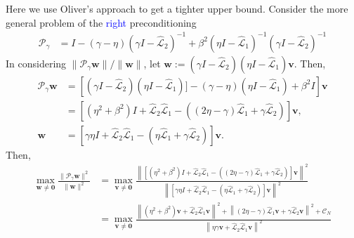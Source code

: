 \documentclass[a4paper,10pt]{article}
\newcommand{\tcb}{\textcolor{blue}}
\begin{document}
{Here we use Oliver's approach to get a tighter upper bound.
Consider the more general problem of the \tcb{right} preconditioning 
%
\begin{align}\nonumber
\mathcal{P}_\gamma & = I - (\gamma - \eta)( \gamma I- \widehat{\mathcal{L}}_2)^{-1} + 
	\beta^2( \eta I-\widehat{\mathcal{L}}_1)^{-1}
	( \gamma I- \widehat{\mathcal{L}}_2)^{-1}\nonumber
\end{align}
%
In considering $\|\mathcal{P}_\gamma\mathbf{w}\|/\|\mathbf{w}\|$, let $\mathbf{w}:= 
(\gamma I- \widehat{\mathcal{L}}_2)(\eta I-\widehat{\mathcal{L}}_1)\mathbf{v}$.
Then,
%
\begin{align*}
\mathcal{P}_\gamma\mathbf{w} & = \left[
	(\gamma I- \widehat{\mathcal{L}}_2)(\eta I-\widehat{\mathcal{L}}_1) ]
	 - (\gamma - \eta)(\eta I-\widehat{\mathcal{L}}_1) + \beta^2 I\right]\mathbf{v} \\
& = \left[ (\eta^2+\beta^2) I +	\widehat{\mathcal{L}}_2\widehat{\mathcal{L}}_1 -
	( (2\eta - \gamma)\widehat{\mathcal{L}}_1 +
	\gamma \widehat{\mathcal{L}}_2) \right]\mathbf{v}, \\
\mathbf{w} & = \left[ \gamma\eta I + \widehat{\mathcal{L}}_2\widehat{\mathcal{L}}_1 
	- (\eta \widehat{\mathcal{L}}_1 + \gamma\widehat{\mathcal{L}}_2)
	\right]\mathbf{v}.
\end{align*}
%
Then, 
%
\begin{align}\nonumber
\max_{\mathbf{w}\neq\mathbf{0}}
\frac{\|\mathcal{P}_\gamma\mathbf{w}\|^2}{\|\mathbf{w}\|^2}
	& = \max_{\mathbf{v}\neq\mathbf{0}}
	 \frac{\left\|\left[ (\eta^2+\beta^2) I +
		\widehat{\mathcal{L}}_2\widehat{\mathcal{L}}_1 -
		( (2\eta - \gamma)\widehat{\mathcal{L}}_1 +
		\gamma \widehat{\mathcal{L}}_2) \right]\mathbf{v}\right\|^2}
	{\left\|\left[ \gamma\eta I + \widehat{\mathcal{L}}_2\widehat{\mathcal{L}}_1 
		- (\eta \widehat{\mathcal{L}}_1 + \gamma\widehat{\mathcal{L}}_2)
		\right]\mathbf{v}\right\|^2 } \\
& = \max_{\mathbf{v}\neq\mathbf{0}}
	\frac{\left\| (\eta^2+\beta^2) \mathbf{v} +
	\widehat{\mathcal{L}}_2\widehat{\mathcal{L}}_1\mathbf{v}\right\|^2
	+ \left\|(2\eta - \gamma)\widehat{\mathcal{L}}_1\mathbf{v} +
		\gamma \widehat{\mathcal{L}}_2\mathbf{v}\right\|^2 + \mathcal{C}_N}
	{\left\| \eta\gamma \mathbf{v} +
		\widehat{\mathcal{L}}_2\widehat{\mathcal{L}}_1\mathbf{v}\right\|^2
}
\end{align}}
\end{document}
